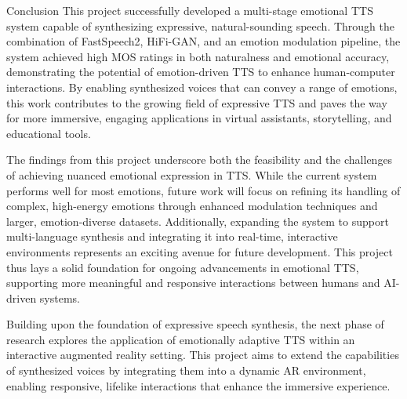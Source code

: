 Conclusion
This project successfully developed a multi-stage emotional TTS system capable of synthesizing expressive, natural-sounding speech. Through the combination of FastSpeech2, HiFi-GAN, and an emotion modulation pipeline, the system achieved high MOS ratings in both naturalness and emotional accuracy, demonstrating the potential of emotion-driven TTS to enhance human-computer interactions. By enabling synthesized voices that can convey a range of emotions, this work contributes to the growing field of expressive TTS and paves the way for more immersive, engaging applications in virtual assistants, storytelling, and educational tools.

The findings from this project underscore both the feasibility and the challenges of achieving nuanced emotional expression in TTS. While the current system performs well for most emotions, future work will focus on refining its handling of complex, high-energy emotions through enhanced modulation techniques and larger, emotion-diverse datasets. Additionally, expanding the system to support multi-language synthesis and integrating it into real-time, interactive environments represents an exciting avenue for future development. This project thus lays a solid foundation for ongoing advancements in emotional TTS, supporting more meaningful and responsive interactions between humans and AI-driven systems.

Building upon the foundation of expressive speech synthesis, the next phase of research explores the application of emotionally adaptive TTS within an interactive augmented reality setting. This project aims to extend the capabilities of synthesized voices by integrating them into a dynamic AR environment, enabling responsive, lifelike interactions that enhance the immersive experience.
